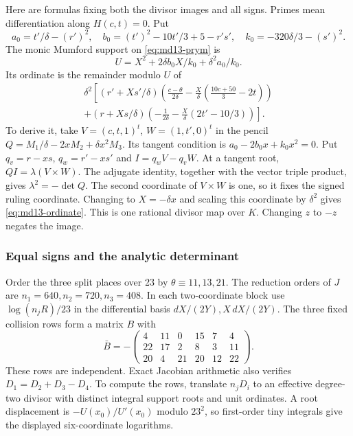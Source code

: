 Here are formulas fixing both the divisor images and all signs.
Primes mean differentiation along $H(c,t)=0$. Put
\[
 a_0=t'/\delta-(r')^2,\quad
 b_0=(t')^2-10t'/3+5-r's',\quad
 k_0=-320\delta/3-(s')^2.
\]
The monic Mumford support on \eqref{eq:md13-prym} is
\[
 U=X^2+2\delta b_0X/k_0+\delta^2a_0/k_0.
\]
Its ordinate is the remainder modulo $U$ of
\begin{multline}\label{eq:md13-ordinate}
 \delta^2\left[
 (r'+Xs'/\delta)\left(\frac{c-\theta}{2\delta}
                      -\frac X\delta\left(\frac{10c+50}{3}-2t\right)\right)\right.\\
 \left. +(r+Xs/\delta)\left(-\frac1{2\delta}
                         -\frac X\delta(2t'-10/3)\right)\right].
\end{multline}
To derive it, take $V=(c,t,1)^t$, $W=(1,t',0)^t$ in the pencil
$Q=M_1/\delta-2xM_2+\delta x^2M_3$. Its tangent condition is
$a_0-2b_0x+k_0x^2=0$. Put $q_v=r-xs$, $q_w=r'-xs'$ and
$I=q_wV-q_vW$. At a tangent root, $QI=\lambda(V\times W)$.
The adjugate identity, together with the vector triple product, gives
$\lambda^2=-\det Q$. The second coordinate of $V\times W$ is
one, so it fixes the signed ruling coordinate. Changing to
$X=-\delta x$ and scaling this coordinate by $\delta^2$ gives
\eqref{eq:md13-ordinate}. This is one rational divisor map over $K$.
Changing $z$ to $-z$ negates the image.

\subsubsection{Equal signs and the analytic determinant}

Order the three split places over 23 by
$\theta\equiv11,13,21$. The reduction orders of $J$ are
$n_1=640,n_2=720,n_3=408$. In each two-coordinate block use
$\log(n_jR)/23$ in the differential basis
$dX/(2Y),X\,dX/(2Y)$. The three fixed collision rows form a
matrix $B$ with
\[
 \bar B=-\begin{pmatrix}
 4&11&0&15&7&4\\22&17&2&8&3&11\\20&4&21&20&12&22
 \end{pmatrix}.
\]
These rows are independent. Exact Jacobian arithmetic also verifies
$D_1=D_2+D_3-D_4$. To compute the rows, translate $n_jD_i$ to
an effective degree-two divisor with distinct integral support roots
and unit ordinates. A root displacement is $-U(x_0)/U'(x_0)$
modulo $23^2$, so first-order tiny integrals give the displayed
six-coordinate logarithms.

